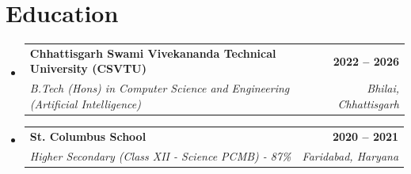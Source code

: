 \documentclass[letterpaper,10pt]{article}
\makeatletter
\newcommand{\resumeSubheading}[4]{
  \vspace{-1pt}\item
    \begin{tabular*}{0.97\textwidth}[t]{l@{\extracolsep{\fill}}r}
      \textbf{#1} & \color{greenTheme}\textbf{#2} \\
      \textit{\small#3} & \textit{\small\color{lightGray} #4} \\
    \end{tabular*}\vspace{-6pt}
}
\newcommand{\resumeSubHeadingListStart}{\begin{itemize}[leftmargin=0.15in, label={}]}
\newcommand{\resumeSubHeadingListEnd}{\end{itemize}}
\makeatother
\begin{document}
\section{Education}
\resumeSubHeadingListStart
\resumeSubheading{Chhattisgarh Swami Vivekananda Technical University (CSVTU)}{2022 -- 2026}{B.Tech (Hons) in Computer Science and Engineering (Artificial Intelligence)}{Bhilai, Chhattisgarh}
\resumeSubHeadingListEnd

\resumeSubHeadingListStart
\resumeSubheading{St. Columbus School}{2020 -- 2021}{Higher Secondary (Class XII - Science PCMB) - 87\%}{Faridabad, Haryana}
\resumeSubHeadingListEnd
\end{document}
